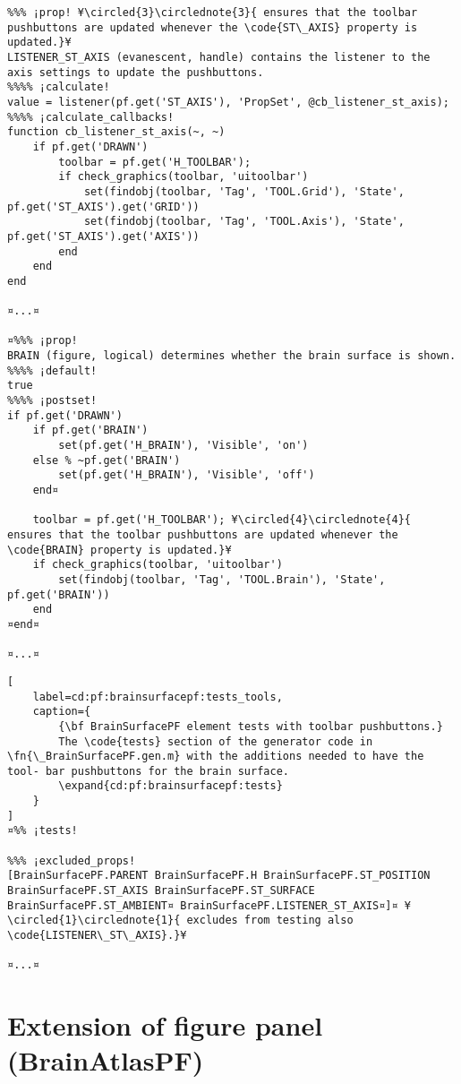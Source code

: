 \documentclass{tufte-handout}
\begin{document}
\begin{lstlisting}
%%% ¡prop! ¥\circled{3}\circlednote{3}{ ensures that the toolbar pushbuttons are updated whenever the \code{ST\_AXIS} property is updated.}¥
LISTENER_ST_AXIS (evanescent, handle) contains the listener to the axis settings to update the pushbuttons.
%%%% ¡calculate!
value = listener(pf.get('ST_AXIS'), 'PropSet', @cb_listener_st_axis); 
%%%% ¡calculate_callbacks!
function cb_listener_st_axis(~, ~)
    if pf.get('DRAWN')
        toolbar = pf.get('H_TOOLBAR');
        if check_graphics(toolbar, 'uitoolbar')
            set(findobj(toolbar, 'Tag', 'TOOL.Grid'), 'State', pf.get('ST_AXIS').get('GRID'))
            set(findobj(toolbar, 'Tag', 'TOOL.Axis'), 'State', pf.get('ST_AXIS').get('AXIS'))
        end
    end
end

¤...¤

¤%%% ¡prop!
BRAIN (figure, logical) determines whether the brain surface is shown.
%%%% ¡default!
true
%%%% ¡postset!
if pf.get('DRAWN')
    if pf.get('BRAIN')
        set(pf.get('H_BRAIN'), 'Visible', 'on')
    else % ~pf.get('BRAIN') 
        set(pf.get('H_BRAIN'), 'Visible', 'off')
    end¤

    toolbar = pf.get('H_TOOLBAR'); ¥\circled{4}\circlednote{4}{ ensures that the toolbar pushbuttons are updated whenever the \code{BRAIN} property is updated.}¥
    if check_graphics(toolbar, 'uitoolbar')
        set(findobj(toolbar, 'Tag', 'TOOL.Brain'), 'State', pf.get('BRAIN'))
    end
¤end¤

¤...¤
\end{lstlisting}

\begin{lstlisting}[
	label=cd:pf:brainsurfacepf:tests_tools,
	caption={
		{\bf BrainSurfacePF element tests with toolbar pushbuttons.}
		The \code{tests} section of the generator code in \fn{\_BrainSurfacePF.gen.m} with the additions needed to have the tool- bar pushbuttons for the brain surface.
		\expand{cd:pf:brainsurfacepf:tests}
	}
]
¤%% ¡tests!

%%% ¡excluded_props! 
[BrainSurfacePF.PARENT BrainSurfacePF.H BrainSurfacePF.ST_POSITION BrainSurfacePF.ST_AXIS BrainSurfacePF.ST_SURFACE BrainSurfacePF.ST_AMBIENT¤ BrainSurfacePF.LISTENER_ST_AXIS¤]¤ ¥\circled{1}\circlednote{1}{ excludes from testing also \code{LISTENER\_ST\_AXIS}.}¥

¤...¤
\end{lstlisting}

\clearpage

\section{Extension of figure panel (BrainAtlasPF)}
\end{document}
